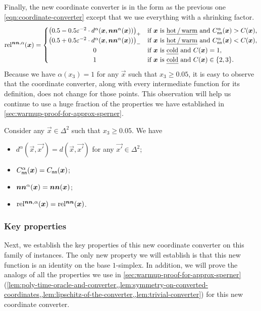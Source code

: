 Finally, the new coordinate converter is in the form as the previous one \cref{eqn:coordinate-converter} except that we use everything with a shrinking factor.
\begin{align}
    \label{eqn:new-coordinate-converter}
    \rela(\vec{x}) = \begin{cases}
        \hfill \left(0.5 - 0.5\eps^{-2} \cdot d^\alpha(\vec{x}, \nna(\vec{x}))
        \right)_+ \hfill & \text{if $\vec{x}$ is {\em hot\,/\,warm} and $C^\alpha_{\sf nn}(\vec{x})>C(\vec{x})$,}\\
        \left(0.5 + 0.5\eps^{-2} \cdot d^\alpha(\vec{x}, \nna(\vec{x}))\right)_- & \text{if $\vec{x}$ is {\em hot\,/\,warm} and $C^\alpha_{\sf nn}(\vec{x})<C(\vec{x})$,}\\
        \hfill 0 \hfill & \text{if $\vec{x}$ is {\em cold} and $C(\vec{x})=1$,}\\
        \hfill 1 \hfill & \text{if $\vec{x}$ is {\em cold} and $C(\vec{x})\in \{2,3\}$.}
    \end{cases}
\end{align}
Because we have $\alpha(x_3)=1$ for any $\vec{x}$ such that $x_3\geq 0.05$, it is easy to observe that the coordinate converter, along with every intermediate function for its definition, does not change for those points.
This observation will help us continue to use a huge fraction of the properties we have established in \cref{sec:warmup-proof-for-approx-sperner}.
\begin{observation}
    \label{lem:same-def-for-converted-coordinate}
    Consider any $\vec{x}\in \Delta^2$ such that $x_3\geq 0.05$.
    We have 
    \begin{itemize}[itemsep=0em, topsep=0.3em]
        \item $d^{\alpha}(\vec{x}, \vec{x'})=d(\vec{x}, \vec{x'})$ for any $\vec{x'}\in \Delta^2$;
        \item $C^{\alpha}_{\sf nn}(\vec{x}) = C_{\sf nn}(\vec{x})$;
        \item $\nna(\vec{x})=\nn(\vec{x})$;
        \item $\rela(\vec{x})=\rel(\vec{x})$.
    \end{itemize}
\end{observation}

\subsubsection{Key properties}
Next, we establish the key properties of this new coordinate converter on this family of instances.
The only new property we will establish is that this new function is an identity on the base $1$-simplex.
In addition, we will prove the analogs of all the properties we use in \cref{sec:warmup-proof-for-approx-sperner} (\cref{lem:poly-time-oracle-and-converter,,lem:symmetry-on-converted-coordinates,,lem:lipschitz-of-the-converter,,lem:trivial-converter}) for this new coordinate converter. 

